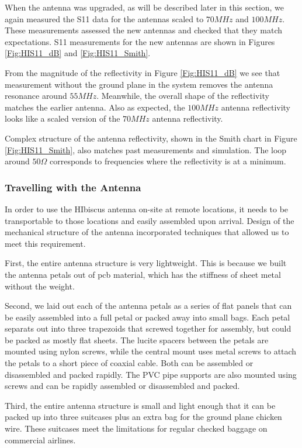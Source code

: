 When the antenna was upgraded, as will be described later in this section, we again measured the S11 data for the antennas scaled to $70 MHz$ and $100 MHz$. These measurements assessed the new antennas and checked that they match expectations. S11 measurements for the new antennas are shown in Figures \ref{Fig:HIS11_dB} and \ref{Fig:HIS11_Smith}. 

From the magnitude of the reflectivity in Figure \ref{Fig:HIS11_dB} we see that measurement without the ground plane in the system removes the antenna resonance around $55 MHz$. Meanwhile, the overall shape of the reflectivity matches the earlier antenna. Also as expected, the $100 MHz$ antenna reflectivity looks like a scaled version of the $70 MHz$ antenna reflectivity. 

Complex structure of the antenna reflectivity, shown in the Smith chart in Figure \ref{Fig:HIS11_Smith}, also matches past measurements and simulation. The loop around $50 \Omega$ corresponds to frequencies where the reflectivity is at a minimum. 

\subsubsection{Travelling with the Antenna}

In order to use the HIbiscus antenna on-site at remote locations, it needs to be transportable to those locations and easily assembled upon arrival. Design of the mechanical structure of the antenna incorporated techniques that allowed us to meet this requirement. 

First, the entire antenna structure is very lightweight. This is because we built the antenna petals out of pcb material, which has the stiffness of sheet metal without the weight.  

Second, we laid out each of the antenna petals as a series of flat panels that can be easily assembled into a full petal or packed away into small bags. Each petal separats out into three trapezoids that screwed together for assembly, but could be packed as mostly flat sheets. The lucite spacers between the petals are mounted using nylon screws, while the central mount uses metal screws to attach the petals to a short piece of coaxial cable. Both can be assembled or disassembled and packed rapidly. The PVC pipe supports are also mounted using screws and can be rapidly assembled or disassembled and packed. 

Third, the entire antenna structure is small and light enough that it can be packed up into three suitcases plus an extra bag for the ground plane chicken wire. These suitcases meet the limitations for regular checked baggage on commercial airlines. 

